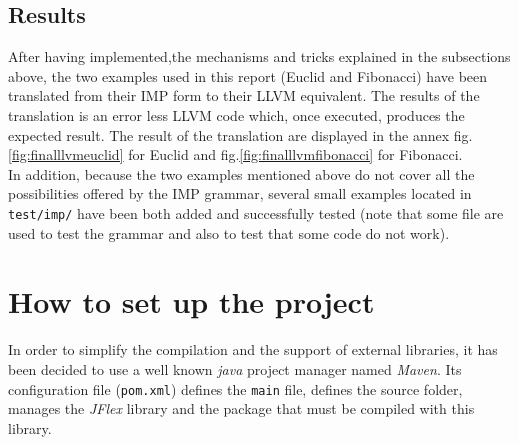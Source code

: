 \documentclass[a4paper,11pt]{article}
\begin{document}
  \subsection{Results}
  After having implemented,the mechanisms and tricks explained in the subsections above, the two examples used in this report (Euclid and Fibonacci) have been translated from their IMP form to their LLVM equivalent. The results of the translation is an error less LLVM code which, once executed, produces the expected result. The result of the translation are displayed in the annex fig.\ref{fig:finalllvmeuclid} for Euclid and fig.\ref{fig:finalllvmfibonacci} for Fibonacci.\\
  In addition, because the two examples mentioned above do not cover all the possibilities offered by the IMP grammar, several small examples located in \verb|test/imp/| have been both added and successfully tested (note that some file are used to test the grammar and also to test that some code do not work).

\section{How to set up the project}
  In order to simplify the compilation and the support of external libraries, it has been decided to use a well known \textit{java} project manager named \textit{Maven}. Its configuration file (\verb|pom.xml|) defines the \verb|main| file, defines the source folder, manages the \textit{JFlex} library and the package that must be compiled with this library.
\end{document}
